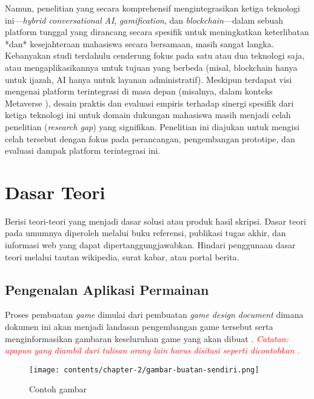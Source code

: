 \hspace{1.25cm} Namun, penelitian yang secara komprehensif mengintegrasikan ketiga teknologi ini—\textit{hybrid conversational AI}, \textit{gamification}, dan \textit{blockchain}—dalam sebuah platform tunggal yang dirancang secara spesifik untuk meningkatkan keterlibatan *dan* kesejahteraan mahasiswa secara bersamaan, masih sangat langka. Kebanyakan studi terdahulu cenderung fokus pada satu atau dua teknologi saja, atau mengaplikasikannya untuk tujuan yang berbeda (misal, blockchain hanya untuk ijazah, AI hanya untuk layanan administratif). Meskipun terdapat visi mengenai platform terintegrasi di masa depan (misalnya, dalam konteks Metaverse \cite{integrated_metaverse_blockchain_ai_education_2025}), desain praktis dan evaluasi empiris terhadap sinergi spesifik dari ketiga teknologi ini untuk domain dukungan mahasiswa masih menjadi celah penelitian (\textit{research gap}) yang signifikan. Penelitian ini diajukan untuk mengisi celah tersebut dengan fokus pada perancangan, pengembangan prototipe, dan evaluasi dampak platform terintegrasi ini.


\section{Dasar Teori}

Berisi teori-teori yang menjadi dasar solusi atau produk hasil skripsi. Dasar teori pada umumnya diperoleh melalui buku referensi, publikasi tugas akhir, dan informasi web yang dapat dipertanggungjawabkan. Hindari penggunaan dasar teori melalui tautan wikipedia, surat kabar, atau portal berita.

\subsection{Pengenalan Aplikasi Permainan}

Proses pembuatan \textit{game} dimulai dari pembuatan \textit{game design document} dimana 
dokumen ini akan menjadi landasan pengembangan game tersebut serta menginformasikan gambaran keseluruhan game yang akan dibuat \cite{ferdiana2012agile}. \textcolor{red}{\textit{Catatan: apapun yang diambil dari tulisan orang lain harus disitasi seperti dicontohkan \cite{ferdiana2012agile}.}}

\begin{figure}[h]
	\centering
	\texttt{[image: contents/chapter-2/gambar-buatan-sendiri.png]}
	\caption[Contoh gambar]{Contoh gambar \cite{lukito2016}}
	\label{Fig:gambar-buatan-sendiri}
\end{figure}



